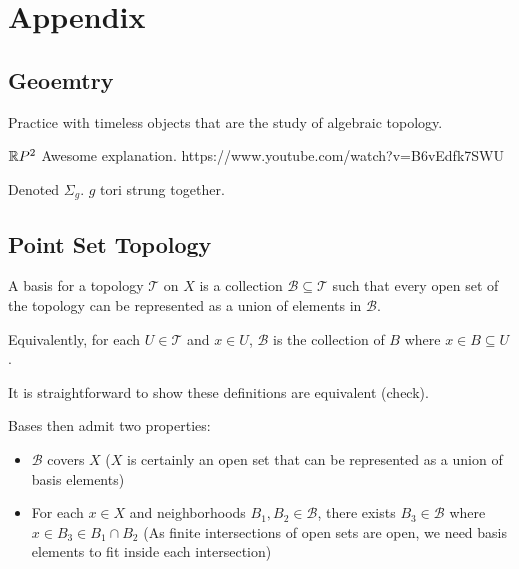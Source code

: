\documentclass[10pt]{article}
\begin{document}
\section{Appendix}

\subsection{Geoemtry}

Practice with timeless objects that are the study of algebraic topology.

\begin{note}
	$\mathbb{R} P^2$
Awesome explanation. https://www.youtube.com/watch?v=B6vEdfk7SWU
\end{note}

\begin{note}
Denoted $\Sigma_g$. $g$ tori strung together.
\end{note}

\subsection{Point Set Topology}

\begin{definition}[Basis]

	A basis for a topology $\mathscr{T}$ on $X$ is a collection $\mathscr{B}
	\subseteq \mathscr{T}$ such that every open set of the topology can be
	represented as a union of elements in $\mathscr{B}$.

	Equivalently, for each $U \in \mathscr{T}$ and $x \in U$, $\mathscr{B}$
	is the collection of $B$ where $x \in B \subseteq U$.

\end{definition}

It is straightforward to show these definitions are equivalent (check).

Bases then admit two properties:
\begin{itemize}
	\item{$\mathscr{B}$ covers $X$ ($X$ is certainly an open set that can be
		represented as a union of basis elements)}
\item{For each $x \in X$ and neighborhoods $B_1, B_2 \in \mathscr{B}$, there exists $B_3 \in
	\mathscr{B}$ where $x \in B_3 \in B_1 \cap B_2$ (As finite intersections of
open sets are open, we need basis elements to fit inside each intersection)}
\end{itemize}
\end{document}
